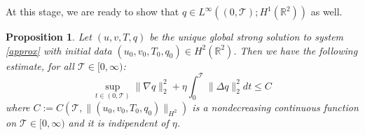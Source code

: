 \documentclass[11pt, a4paper, article,reqno,]{amsart}
\newtheorem{proposition}[theorem]{Proposition}
\theoremstyle{remark}
\numberwithin{equation}{section}
\begin{document}
At this stage, we are ready to show that $q \in L^{\infty}((0,\mathcal{T}); H^1(\mathbb{R}^2))$ as well.

\begin{proposition} \label{h1_q}
    Let $(u,v,T,q)$ be the unique global strong solution to system \eqref{approx} with initial data $(u_0,v_0,T_{0},q_0) \in H^2(\mathbb{R}^2)$. Then we have the following estimate, for all $\mathcal{T} \in [0,\infty)$:
    \begin{equation*}
    \sup_{t \in (0,\mathcal{T})} \|\nabla q\|_2^2  + \eta \int_0^{\mathcal{T}}\|\Delta q \|_2^2 dt \leq C
    \end{equation*}
    where $C:= C(\mathcal{T},\|(u_0,v_0,T_0,q_0)\|_{H^2})$ is a nondecreasing continuous function on  $\mathcal{T} \in [0,\infty)$ and it is indipendent of $\eta$.
    \end{proposition}
\end{document}
